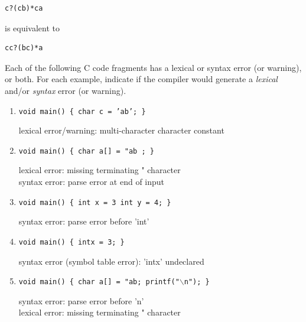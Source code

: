 \documentclass[12pt]{article}
\begin{document}
\begin{exe}
\begin{xlist}
{\bigskip
\begin{soln}
\begin{verbatim}
c?(cb)*ca
\end{verbatim}
is equivalent to
\begin{verbatim}
cc?(bc)*a
\end{verbatim}
\end{soln}

}

{\ex Each of the following C code fragments has a lexical or syntax error (or warning), or both. 
For each example, indicate if the compiler would generate a {\em lexical} and/or {\em syntax} error
(or warning).

\begin{enumerate}

\item {\small\tt void main() \{ char c = 'ab';  \}} 
\begin{soln}
lexical error/warning: multi-character character constant
\end{soln}

\item {\small\tt void main() \{ char a[] = "ab ; \}}
\begin{soln}

\noindent
lexical error: missing terminating " character \\
syntax error: parse error at end of input
\end{soln}

\item {\small\tt void main() \{ int x = 3 int y = 4; \}}
\begin{soln}
syntax error: parse error before 'int'
\end{soln}

\item {\small\tt void main() \{ intx = 3; \}}
\begin{soln}
syntax error (symbol table error): 'intx' undeclared
\end{soln}

\item {\small\tt void main() \{ char a[] = "ab; printf("$\backslash$n"); \}}
\begin{soln}

\noindent
syntax error: parse error before 'n' \\
lexical error: missing terminating " character
\end{soln}

\end{enumerate}

}
\end{xlist}
\end{exe}
\end{document}
